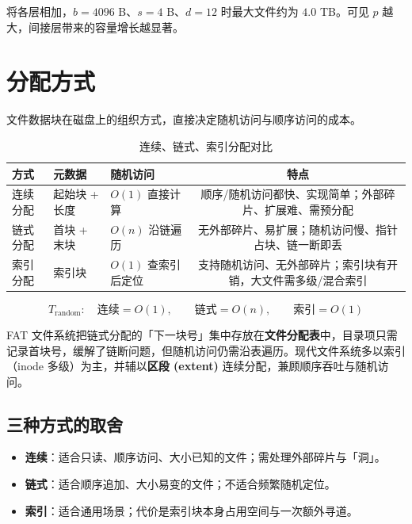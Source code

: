 将各层相加，$b=4096$ B、$s=4$ B、$d=12$ 时最大文件约为 $4.0$ TB。可见 $p$ 越大，间接层带来的容量增长越显著。

\section{分配方式}

文件数据块在磁盘上的组织方式，直接决定随机访问与顺序访问的成本。

\begin{table}[H]
\centering
\caption{连续、链式、索引分配对比}
\begin{tabulary}{\textwidth}{LLLC}
\toprule
方式 & 元数据 & 随机访问 & 特点 \\
\midrule
连续分配 & 起始块 + 长度 & $O(1)$ 直接计算 & 顺序/随机访问都快、实现简单；外部碎片、扩展难、需预分配 \\
链式分配 & 首块 + 末块 & $O(n)$ 沿链遍历 & 无外部碎片、易扩展；随机访问慢、指针占块、链一断即丢 \\
索引分配 & 索引块 & $O(1)$ 查索引后定位 & 支持随机访问、无外部碎片；索引块有开销，大文件需多级/混合索引 \\
\bottomrule
\end{tabulary}
\end{table}

\begin{equation}
    T_{\text{random}}:\quad \text{连续} = O(1),\qquad \text{链式} = O(n),\qquad \text{索引} = O(1)
\end{equation}

FAT 文件系统把链式分配的「下一块号」集中存放在\textbf{文件分配表}中，目录项只需记录首块号，缓解了链断问题，但随机访问仍需沿表遍历。现代文件系统多以索引（inode 多级）为主，并辅以\textbf{区段 (extent)} 连续分配，兼顾顺序吞吐与随机访问。

\subsection{三种方式的取舍}

\begin{itemize}
    \item \textbf{连续}：适合只读、顺序访问、大小已知的文件；需处理外部碎片与「洞」。
    \item \textbf{链式}：适合顺序追加、大小易变的文件；不适合频繁随机定位。
    \item \textbf{索引}：适合通用场景；代价是索引块本身占用空间与一次额外寻道。
\end{itemize}

